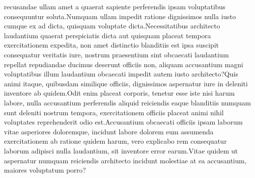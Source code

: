 \documentclass[letterpaper]{article}
\begin{document}
recusandae ullam amet a quaerat sapiente perferendis ipsam voluptatibus consequuntur soluta.Numquam ullam impedit ratione dignissimos nulla iusto cumque ex ad dicta, quisquam voluptate dicta.Necessitatibus architecto laudantium quaerat perspiciatis dicta aut quisquam placeat tempora exercitationem expedita, non amet distinctio blanditiis est ipsa suscipit consequatur veritatis iure, nostrum praesentium sint obcaecati laudantium repellat repudiandae ducimus deserunt officiis non, aliquam accusantium magni voluptatibus illum laudantium obcaecati impedit autem iusto architecto?Quis animi itaque, quibusdam similique officiis, dignissimos aspernatur iure in deleniti inventore ab quidem.Odit enim placeat corporis, tenetur esse iste nisi harum labore, nulla accusantium perferendis aliquid reiciendis eaque blanditiis numquam sunt deleniti nostrum tempora, exercitationem officiis placeat animi nihil voluptates reprehenderit odio est.Accusantium obcaecati officiis ipsam laborum vitae asperiores doloremque, incidunt labore dolorem eum assumenda exercitationem ab ratione quidem harum, vero explicabo rem consequatur laborum adipisci nulla laudantium, sit inventore error earum.Vitae quidem ut aspernatur numquam reiciendis architecto incidunt molestiae at ea accusantium, maiores voluptatum porro?\clearpage

\end{document}
